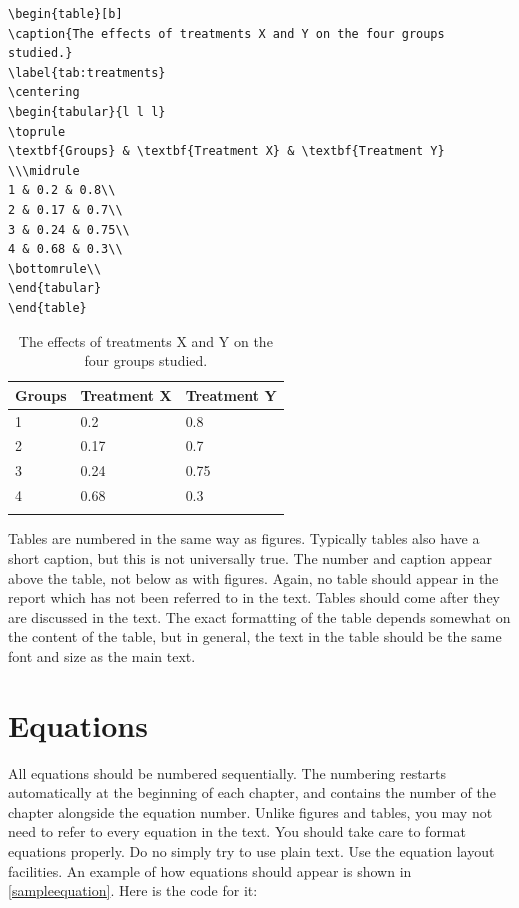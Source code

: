 {\footnotesize
\begin{verbatim}
\begin{table}[b]
\caption{The effects of treatments X and Y on the four groups studied.}
\label{tab:treatments}
\centering
\begin{tabular}{l l l}
\toprule
\textbf{Groups} & \textbf{Treatment X} & \textbf{Treatment Y} \\\midrule
1 & 0.2 & 0.8\\
2 & 0.17 & 0.7\\
3 & 0.24 & 0.75\\
4 & 0.68 & 0.3\\
\bottomrule\\
\end{tabular}
\end{table}
\end{verbatim}
}

\begin{table}[b]
\caption{The effects of treatments X and Y on the four groups studied.}
\label{tab:treatments}
\centering
\begin{tabular}{l l l}
\toprule
\textbf{Groups} & \textbf{Treatment X} & \textbf{Treatment Y} \\
\midrule
1 & 0.2 & 0.8\\
2 & 0.17 & 0.7\\
3 & 0.24 & 0.75\\
4 & 0.68 & 0.3\\
\bottomrule\\
\end{tabular}
\end{table}

Tables are numbered in the same way as figures. Typically tables also have a short caption, but this is not universally true. The number and caption appear above the table, not below as with figures. Again, no table should appear in the report which has not been referred to in the text. Tables should come after they are discussed in the text. The exact formatting of the table depends somewhat on the content of the table, but in general, the text in the table should be the same font and size as the main text. 

\section{Equations}
All equations should be numbered sequentially. The numbering restarts automatically at the beginning of each chapter, and contains the number of the chapter alongside the equation number. Unlike figures and tables, you may not need to refer to every equation in the text. You should take care to format equations properly. Do no simply try to use plain text. Use the equation layout facilities. An example of how equations should appear is shown in \eqref{sampleequation}. Here is the code for it:

